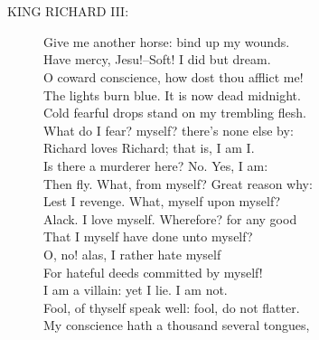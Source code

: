 \documentclass{article}
\begin{document}
\\
\\
\begin{description}
\item[KING RICHARD III:] 
\hspace{1pt}Give me another horse: bind up my wounds.\\
\hspace{1pt}Have mercy, Jesu!--Soft! I did but dream.\\
\hspace{1pt}O coward conscience, how dost thou afflict me!\\
\hspace{1pt}The lights burn blue. It is now dead midnight.\\
\hspace{1pt}Cold fearful drops stand on my trembling flesh.\\
\hspace{1pt}What do I fear?  myself?  there's none else by:\\
\hspace{1pt}Richard loves Richard; that is, I am I.\\
\hspace{1pt}Is there a murderer here?  No. Yes, I am:\\
\hspace{1pt}Then fly. What, from myself?   Great reason why:\\
\hspace{1pt}Lest I revenge. What, myself upon myself?\\
\hspace{1pt}Alack. I love myself. Wherefore?  for any good\\
\hspace{1pt}That I myself have done unto myself?\\
\hspace{1pt}O, no! alas, I rather hate myself\\
\hspace{1pt}For hateful deeds committed by myself!\\
\hspace{1pt}I am a villain: yet I lie. I am not.\\
\hspace{1pt}Fool, of thyself speak well: fool, do not flatter.\\
\hspace{1pt}My conscience hath a thousand several tongues,\\

\end{description}
\end{document}

